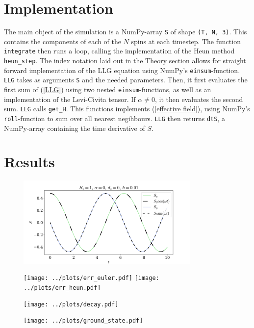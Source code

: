 \documentclass{article}
\begin{document}
    \section*{Implementation}
    The main object of the simulation is a NumPy-array \verb|S| of shape \verb|(T, N, 3)|. This contains the components of each of the $N$ spins at each timestep. The function \verb|integrate| then runs a loop, calling the implementation of the Heun method \verb|heun_step|. The index notation laid out in the Theory section allows for straight forward implementation of the LLG equation using NumPy's \verb|einsum|-function. \verb|LLG| takes as arguments \verb|S| and the needed parameters. Then, it first evaluates the first sum of (\ref{LLG}) using two nested \verb|einsum|-functions, as well as an implementation of the Levi-Civita tensor. If $\alpha \neq 0$, it then evaluates the second sum. \verb|LLG| calls \verb|get_H|. This functions implements (\ref{effective field}), using NumPy's \verb|roll|-function to sum over all nearest negihbours. \verb|LLG| then returns \verb|dtS|, a NumPy-array containing the time derivative of $S$.


    \section*{Results}

    \begin{figure}
        \centering
        \includegraphics[width=0.8\textwidth]{../plots/single.pdf}
    \end{figure}

    \begin{figure}
        \centering
        \texttt{[image: ../plots/err\_euler.pdf]}
        \texttt{[image: ../plots/err\_heun.pdf]}
    \end{figure}

    \begin{figure}
        \centering
        \texttt{[image: ../plots/decay.pdf]}
    \end{figure}

    \begin{figure}
        \centering
        \texttt{[image: ../plots/ground\_state.pdf]}
    \end{figure}

    
    
\end{document}
